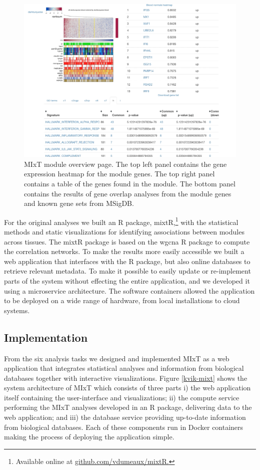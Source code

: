 \begin{figure}[h!]
\centering
\includegraphics[width=\columnwidth]{figures/module.png}
    \caption[MIxT module overview page.]{MIxT module overview page.
The top left panel
contains the gene expression heatmap for the module genes. The top right panel
contains a table of the genes found in the module. The bottom panel contains the
results of gene overlap analyses from the module genes and known gene sets from
MSigDB.}
\label{fig_first_case}
\end{figure} 

For the original analyses we built an R package, mixtR,\footnote{Available
online at \url{github.com/vdumeaux/mixtR.}} with the statistical methods and
static visualizations for identifying associations between modules across
tissues. The mixtR package is based on the \gls{wgcna} R package to compute the
correlation networks\cite{langfelder2008wgcna}.  To make the results more easily
accessible we built a web application
that interfaces with the R package, but also online databases to retrieve
relevant metadata. To make it possible to easily update or re-implement parts of
the system without effecting the entire application, and we developed it using a
microservice architecture. The software containers allowed the application to be
deployed on a wide range of hardware, from local installations to cloud systems.

\subsection{Implementation} 
From the six analysis tasks we designed and implemented MIxT as a web
application that integrates statistical analyses and information from biological
databases together with interactive visualizations. Figure \ref{kvik-mixt} shows
the system architecture of MIxT which consists of three parts i) the
web application itself containing the user-interface and visualizations; ii) the
compute service performing the MIxT analyses developed in an R package,
delivering data to the web application; and iii) the database service providing
up-to-date information from biological databases.  Each of these components run
in Docker containers making the process of deploying the application simple. 

